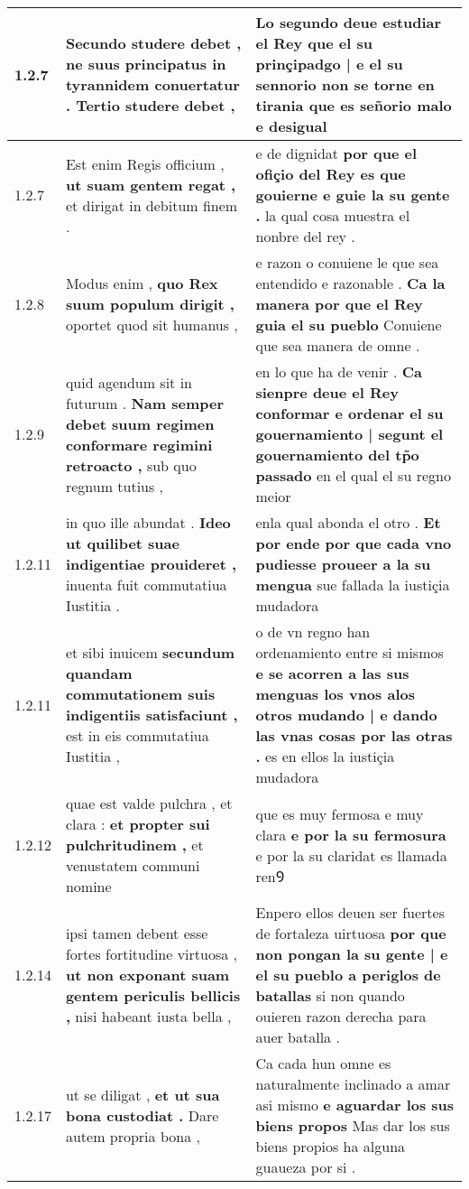 \begin{tabular}{|p{1cm}|p{6.5cm}|p{6.5cm}|}
1.2.7 & Secundo studere debet , \textbf{ ne suus principatus in tyrannidem conuertatur . } Tertio studere debet , & Lo segundo deue estudiar el Rey \textbf{ que el su prinçipadgo | e el su sennorio non se torne en tirania } que es señorio malo e desigual \\\hline
1.2.7 & Est enim Regis officium , \textbf{ ut suam gentem regat , } et dirigat in debitum finem . & e de dignidat \textbf{ por que el ofiçio del Rey es que gouierne e guie la su gente . } la qual cosa muestra el nonbre del rey . \\\hline
1.2.8 & Modus enim , \textbf{ quo Rex suum populum dirigit , } oportet quod sit humanus , & e razon o conuiene le que sea entendido e razonable . \textbf{ Ca la manera por que el Rey guia el su pueblo } Conuiene que sea manera de omne . \\\hline
1.2.9 & quid agendum sit in futurum . \textbf{ Nam semper debet suum regimen conformare regimini retroacto , } sub quo regnum tutius , & en lo que ha de venir . \textbf{ Ca sienpre deue el Rey conformar e ordenar el su gouernamiento | segunt el gouernamiento del tp̃o passado } en el qual el su regno meior \\\hline
1.2.11 & in quo ille abundat . \textbf{ Ideo ut quilibet suae indigentiae prouideret , } inuenta fuit commutatiua Iustitia . & enla qual abonda el otro . \textbf{ Et por ende por que cada vno pudiesse proueer a la su mengua } sue fallada la iustiçia mudadora \\\hline
1.2.11 & et sibi inuicem \textbf{ secundum quandam commutationem suis indigentiis satisfaciunt , } est in eis commutatiua Iustitia , & o de vn regno han ordenamiento entre si mismos \textbf{ e se acorren a las sus menguas los vnos alos otros mudando | e dando las vnas cosas por las otras . } es en ellos la iustiçia mudadora \\\hline
1.2.12 & quae est valde pulchra , et clara : \textbf{ et propter sui pulchritudinem , } et venustatem communi nomine & que es muy fermosa e muy clara \textbf{ e por la su fermosura } e por la su claridat es llamada renꝮ \\\hline
1.2.14 & ipsi tamen debent esse fortes fortitudine virtuosa , \textbf{ ut non exponant suam gentem periculis bellicis , } nisi habeant iusta bella , & Enpero ellos deuen ser fuertes de fortaleza uirtuosa \textbf{ por que non pongan la su gente | e el su pueblo a periglos de batallas } si non quando ouieren razon derecha para auer batalla . \\\hline
1.2.17 & ut se diligat , \textbf{ et ut sua bona custodiat . } Dare autem propria bona , & Ca cada hun omne es naturalmente inclinado a amar asi mismo \textbf{ e aguardar los sus biens propos } Mas dar los sus biens propios ha alguna guaueza por si . \\\hline

\end{tabular}
